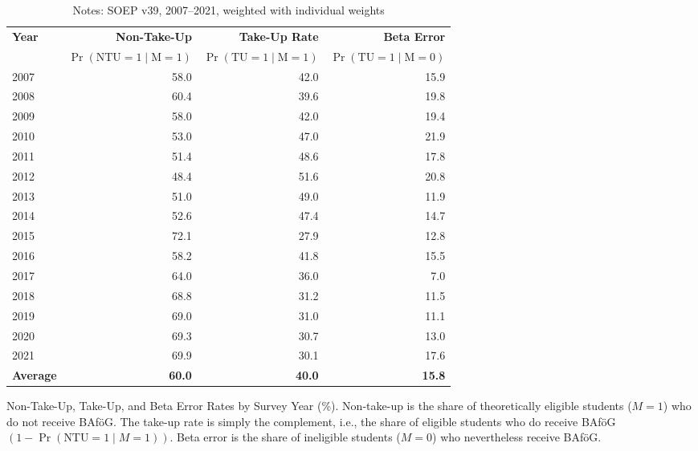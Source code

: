 \begin{table}[htbp]
\small
\centering
\begin{tabular}{l@{\hspace{2em}}r@{\hspace{2em}}r@{\hspace{2em}}r}
\toprule
\textbf{Year} & \textbf{Non-Take-Up} & \textbf{Take-Up Rate} & \textbf{Beta Error} \\
              & \(\Pr(\text{NTU} = 1 \mid \text{M} = 1)\) & \(\Pr(\text{TU} = 1 \mid \text{M} = 1)\) & \(\Pr(\text{TU} = 1 \mid \text{M} = 0)\) \\
\midrule
2007 & 58.0 & 42.0 & 15.9 \\
2008 & 60.4 & 39.6 & 19.8 \\
2009 & 58.0 & 42.0 & 19.4 \\
2010 & 53.0 & 47.0 & 21.9 \\
2011 & 51.4 & 48.6 & 17.8 \\
2012 & 48.4 & 51.6 & 20.8 \\
2013 & 51.0 & 49.0 & 11.9 \\
2014 & 52.6 & 47.4 & 14.7 \\
2015 & 72.1 & 27.9 & 12.8 \\
2016 & 58.2 & 41.8 & 15.5 \\
2017 & 64.0 & 36.0 & 7.0 \\
2018 & 68.8 & 31.2 & 11.5 \\
2019 & 69.0 & 31.0 & 11.1 \\
2020 & 69.3 & 30.7 & 13.0 \\
2021 & 69.9 & 30.1 & 17.6 \\
\midrule
\textbf{Average} & \textbf{60.0} & \textbf{40.0} & \textbf{15.8} \\
\bottomrule
\end{tabular}
\caption{\small{Non-Take-Up, Take-Up, and Beta Error Rates by Survey Year (\%). Non-take-up is the share of theoretically eligible students (\(M=1\)) who do not receive BAföG. The take-up rate is simply the complement, i.e., the share of eligible students who do receive BAföG \((1 - \Pr(\text{NTU} = 1 \mid M = 1))\). Beta error is the share of ineligible students (\(M=0\)) who nevertheless receive BAföG.}}
\caption*{\small{Notes: SOEP v39, 2007--2021, weighted with individual weights}}
\label{table:microsimulation-ntu}
\end{table}
